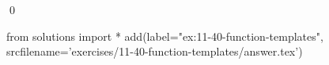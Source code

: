 
\begin{ex}
  \label{ex:11-40-function-templates}
  
  \qed
\end{ex}
\begin{python0}
from solutions import *
add(label="ex:11-40-function-templates",
    srcfilename='exercises/11-40-function-templates/answer.tex')
\end{python0}
